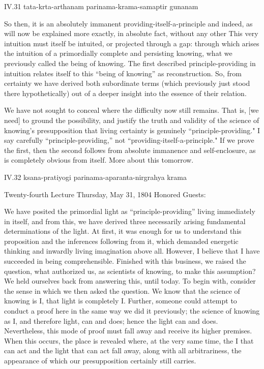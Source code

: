 IV.31
tata-krta-arthanam parinama-krama-samaptir gunanam

So then, it is an absolutely immanent
providing-itself-a-principle and indeed,
as will now be explained more exactly,
in absolute fact,
without any other This very intuition must itself be intuited,
or projected through a gap:
through which arises the intuition of
a primordially complete and persisting knowing,
what we previously called the being of knowing.
The first described principle-providing in intuition
relates itself to this “being of knowing” as reconstruction.
So, from certainty we have derived both subordinate terms
(which previously just stood there hypothetically)
out of a deeper insight into the essence of their relation.

We have not sought to conceal
where the difficulty now still remains.
That is, [we need] to ground the possibility,
and justify the truth and validity
of the science of knowing's presupposition that
living certainty is genuinely “principle-providing."
I say carefully “principle-providing,”
not “providing-itself-a-principle."
If we prove the first, then the second follows
from absolute immanence and self-enclosure,
as is completely obvious from itself.
More about this tomorrow.

IV.32
ksana-pratiyogi parinama-aparanta-nirgrahya krama

Twenty-fourth Lecture
Thursday, May 31, 1804
Honored Guests:

We have posited the primordial light
as “principle-providing”
living immediately in itself,
and from this, we have derived
three necessarily arising fundamental
determinations of the light.
At first, it was enough for us
to understand this proposition
and the inferences following from it,
which demanded energetic thinking and
inwardly living imagination above all.
However, I believe that I have succeeded in being comprehensible.
Finished with this business, we raised the question,
what authorized us, as scientists of knowing,
to make this assumption?
We held ourselves back from answering this, until today.
To begin with, consider the sense
in which we then asked the question.
We know that the science of knowing is I,
that light is completely I.
Further, someone could attempt to conduct a proof here
in the same way we did it previously;
the science of knowing as I, and therefore light, can and does;
hence the light can and does.
Nevertheless, this mode of proof must fall away
and receive its higher premises.
When this occurs, the place is revealed where,
at the very same time,
the I that can act and the light that can act fall away,
along with all arbitrariness,
the appearance of which our presupposition
certainly still carries.

